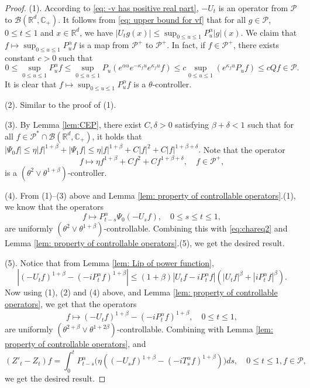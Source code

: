 \documentclass[EJP]{ejpecp} %
\begin{document}
\begin{proof}
  (1). According to \eqref{eq: -v has positive real part}, $-U_t$ is an operator from $\mathcal P$ to $\mathcal B(\mathbb R^d, \mathbb C_+)$.
  It follows from \eqref{eq: upper bound for vf} that for all $g\in \mathcal P$, $0\leq t\leq 1$ and $x\in \mathbb R^d$, we have $ |U_t g(x)| \leq \sup_{0\leq u\leq 1}P_u^\alpha |g| (x). $
  We claim that $f\mapsto\sup_{0\leq u\leq 1}P^{\alpha}_u f$ is a map from $\mathcal P^+$ to $\mathcal P^+$. In fact, if $f\in \mathcal P^+$, there exists constant $c>0$ such that
  \[
    0
    \leq \sup_{0\leq u\leq 1}P^{\alpha}_u f
    \leq \sup_{0\leq u\leq 1} P_u (e^{\alpha u} e^{-\kappa_f u} e^{\kappa_f u} f )
    \leq c \sup_{0\leq u\leq 1} (e^{\kappa_fu}P_u f) \leq c Qf \in \mathcal P.
  \]
	It is clear that $f\mapsto\sup_{0\leq u\leq 1}P^{\alpha}_u f$ is a $\theta$-controller.

  (2). Similar to the proof of (1).

  (3). By Lemma \ref{lem:CEP}, there exist $C, \delta >0$ satisfying $\beta+\delta< 1$ such that for all $ f \in \mathcal P^* \cap \mathcal B( \mathbb R^d, \mathbb C_+ )$, it holds that $ |\Psi_0 f| \leq \eta |f|^{1+\beta} + |\Psi_1 f| \leq \eta |f|^{1+\beta} + C|f|^2+ C |f|^{1+\beta + \delta}.$
  Note that the operator
  \[
    f \mapsto \eta f^{1+\beta} + Cf^2+ Cf^{1+\beta + \delta}
    , \quad f\in \mathcal P^+,
  \]
  is a $(\theta^2 \vee \theta^{1+\beta})$-controller.

  (4). From (1)--(3) above and Lemma \ref{lem: property of controllable operators}.(1), we know that the operators
  \[
    f \mapsto P^\alpha_{t-s}\Psi_0(-U_sf)
    , \quad 0\leq s\leq t\leq 1,
  \]
  are uniformly $(\theta^2\vee \theta^{1+\beta})$-controllable.
  Combining this with \eqref{eq:chareq2} and
  Lemma \ref{lem: property of controllable operators}.(5), we get the desired result.

  (5). Notice that from Lemma \ref{lem: Lip of power function},
  \[
    |(-U_t f)^{1+\beta} - (-iP^\alpha_t f)^{1+\beta} |
    \leq  (1+\beta) |U_t f-iP^\alpha_t f|(|U_t f|^{\beta}+|i P^\alpha_t f|^{\beta}).
  \]
  Now using (1), (2) and (4) above, and Lemma \ref{lem: property of controllable operators}, we get that the operators
  \[
    f \mapsto (-U_t f)^{1+\beta} - (-iP^\alpha_t f)^{1+\beta},\quad 0\leq t\leq 1,
  \]
  are uniformly $(\theta^{2+\beta}\vee \theta^{1+2\beta})$-controllable.
  Combining with Lemma \ref{lem: property of controllable operators}, and
  \[
    (Z'_t - Z_t)f
    = \int_0^t P^\alpha_{t-s}\Big( \eta ((-U_s f)^{1+\beta} - (-iT_s^\alpha f)^{1+\beta} )\Big)ds
    , \quad 0\leq t\leq 1, f\in \mathcal P,
  \]
  we get the desired result.


\end{proof}
\end{document}
